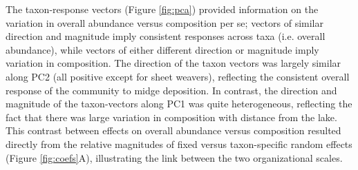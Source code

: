 The taxon-response vectors (Figure \ref{fig:pca})
provided information on the variation in overall abundance versus composition per se;
vectors of similar direction and magnitude
imply consistent responses across taxa (i.e. overall abundance),
while vectors of either different direction or magnitude imply variation in composition.
The direction of the taxon vectors was largely similar along PC2 (all positive
except for sheet weavers), reflecting the consistent overall
response of the community to midge deposition.
In contrast, the direction and magnitude
of the taxon-vectors along PC1 was quite heterogeneous,
reflecting the fact that there was large variation in composition with
distance from the lake.
This contrast between effects on overall abundance versus composition
resulted directly from the relative magnitudes
of fixed versus taxon-specific random effects (Figure \ref{fig:coefs}A),
illustrating the link between the two organizational scales.
